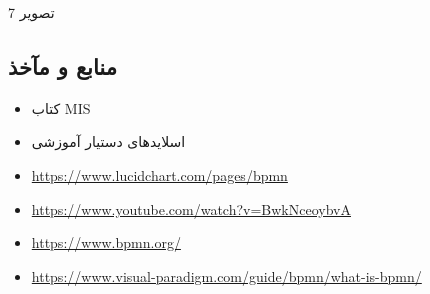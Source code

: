 \documentclass[]{article}
\begin{document}
تصویر 7

\subsection{منابع و
مآخذ}\label{ux645ux646ux627ux628ux639-ux648-ux645ux622ux62eux630-2}

\begin{itemize}
\item
  کتاب MIS
\item
  اسلایدهای دستیار آموزشی
\end{itemize}

\begin{itemize}
\item
  \url{https://www.lucidchart.com/pages/bpmn}
\item
  \url{https://www.youtube.com/watch?v=BwkNceoybvA}
\item
  \url{https://www.bpmn.org/}
\item
  \url{https://www.visual-paradigm.com/guide/bpmn/what-is-bpmn/}
\end{itemize}
\end{document}
